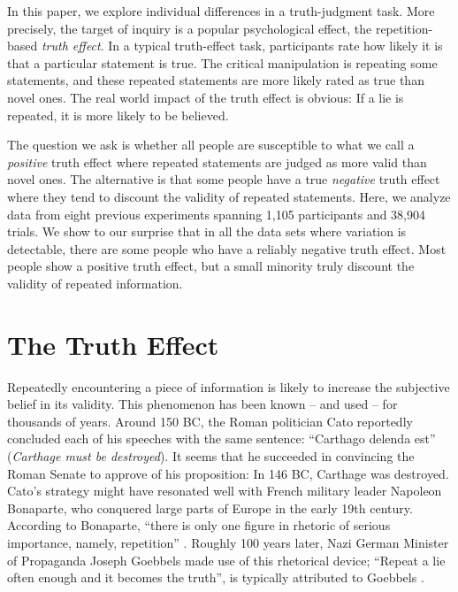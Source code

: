 \documentclass[
  english,
  ,man,floatsintext]{apa6}
\begin{document}
In this paper, we explore individual differences in a truth-judgment task. More precisely, the target of inquiry is a popular psychological effect, the repetition-based \emph{truth effect}. In a typical truth-effect task, participants rate how likely it is that a particular statement is true. The critical manipulation is repeating some statements, and these repeated statements are more likely rated as true than novel ones. The real world impact of the truth effect is obvious: If a lie is repeated, it is more likely to be believed.

The question we ask is whether all people are susceptible to what we call a \emph{positive} truth effect where repeated statements are judged as more valid than novel ones. The alternative is that some people have a true \emph{negative} truth effect where they tend to discount the validity of repeated statements. Here, we analyze data from eight previous experiments spanning 1,105 participants and 38,904 trials. We show to our surprise that in all the data sets where variation is detectable, there are some people who have a reliably negative truth effect. Most people show a positive truth effect, but a small minority truly discount the validity of repeated information.

\hypertarget{the-truth-effect}{%
\section{The Truth Effect}\label{the-truth-effect}}

Repeatedly encountering a piece of information is likely to increase the subjective belief in its validity. This phenomenon has been known -- and used -- for thousands of years. Around 150 BC, the Roman politician Cato reportedly concluded each of his speeches with the same sentence: ``Carthago delenda est'' (\textit{Carthage must be destroyed}). It seems that he succeeded in convincing the Roman Senate to approve of his proposition: In 146 BC, Carthage was destroyed. Cato's strategy might have resonated well with French military leader Napoleon Bonaparte, who conquered large parts of Europe in the early 19th century. According to Bonaparte, ``there is only one figure in rhetoric of serious importance, namely, repetition'' \autocite[p.~125]{lebon1895}. Roughly 100 years later, Nazi German Minister of Propaganda Joseph Goebbels made use of this rhetorical device; ``Repeat a lie often enough and it becomes the truth'', is typically attributed to Goebbels \autocite{stafford2016}.
\end{document}
